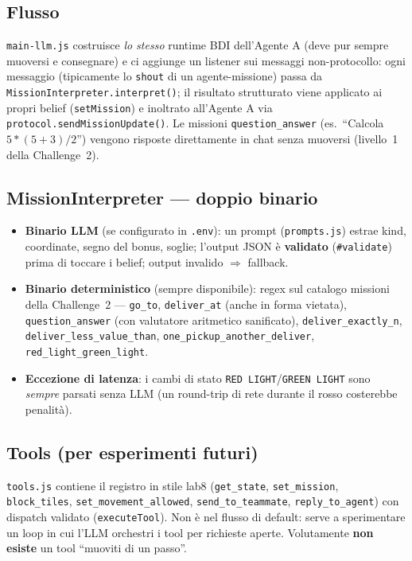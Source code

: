 \documentclass[11pt,a4paper]{article}
\newcommand{\file}[1]{\texttt{#1}}
\newcommand{\code}[1]{\texttt{#1}}
\begin{document}
\subsection{Flusso}

\file{main-llm.js} costruisce \emph{lo stesso} runtime BDI dell'Agente A
(deve pur sempre muoversi e consegnare) e ci aggiunge un listener sui
messaggi non-protocollo: ogni messaggio (tipicamente lo \code{shout} di un
agente-missione) passa da \code{MissionInterpreter.interpret()}; il
risultato strutturato viene applicato ai propri belief
(\code{setMission}) e inoltrato all'Agente A via
\code{protocol.sendMissionUpdate()}. Le missioni \code{question\_answer}
(es.\ ``Calcola $5*(5+3)/2$'') vengono risposte direttamente in chat senza
muoversi (livello~1 della Challenge~2).

\subsection{MissionInterpreter — doppio binario}

\begin{itemize}
  \item \textbf{Binario LLM} (se configurato in \file{.env}): un prompt
    (\file{prompts.js}) estrae kind, coordinate, segno del bonus, soglie;
    l'output JSON è \textbf{validato} (\code{\#validate}) prima di toccare
    i belief; output invalido $\Rightarrow$ fallback.
  \item \textbf{Binario deterministico} (sempre disponibile): regex sul
    catalogo missioni della Challenge~2 — \code{go\_to},
    \code{deliver\_at} (anche in forma vietata), \code{question\_answer}
    (con valutatore aritmetico sanificato), \code{deliver\_exactly\_n},
    \code{deliver\_less\_value\_than}, \code{one\_pickup\_another\_deliver},
    \code{red\_light\_green\_light}.
  \item \textbf{Eccezione di latenza}: i cambi di stato
    \code{RED LIGHT}/\code{GREEN LIGHT} sono \emph{sempre} parsati senza
    LLM (un round-trip di rete durante il rosso costerebbe penalità).
\end{itemize}

\subsection{Tools (per esperimenti futuri)}

\file{tools.js} contiene il registro in stile lab8 (\code{get\_state},
\code{set\_mission}, \code{block\_tiles}, \code{set\_movement\_allowed},
\code{send\_to\_teammate}, \code{reply\_to\_agent}) con dispatch validato
(\code{executeTool}). Non è nel flusso di default: serve a sperimentare un
loop in cui l'LLM orchestri i tool per richieste aperte. Volutamente
\textbf{non esiste} un tool ``muoviti di un passo''.
\end{document}
